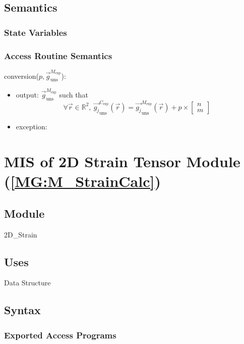 \documentclass[12pt, titlepage]{article}
\begin{document}
\subsection{Semantics}

\subsubsection{State Variables}


\subsubsection{Access Routine Semantics}

\noindent conversion($p,\overrightarrow{g}_{\text{uns}}^{M_{\text{exp}}}$):
\begin{itemize}
\item output: $\overrightarrow{g}_{\text{uns}}^{M_{\text{exp}}}$ such that
	\begin{equation*}
	\forall \vec{r} \in \mathbb{R}^2, \
	\overrightarrow{g_{j}}_{\text{uns}}^{C_{\text{exp}}}(\vec{r})= \overrightarrow{g_{j}}_{\text{uns}}^{M_{\text{exp}}}(\vec{r}) + p \times \begin{bmatrix}
	n \\
	m
	\end{bmatrix}
	\end{equation*}
\item exception:  
\end{itemize}

\section{MIS of 2D Strain Tensor Module (\texorpdfstring{\cref{MG:M_StrainCalc}}))} \label{MIS_StrainCalc}

\subsection{Module}
2D{\_}Strain
\subsection{Uses}
Data Structure
\subsection{Syntax}

\subsubsection{Exported Access Programs}
\end{document}
